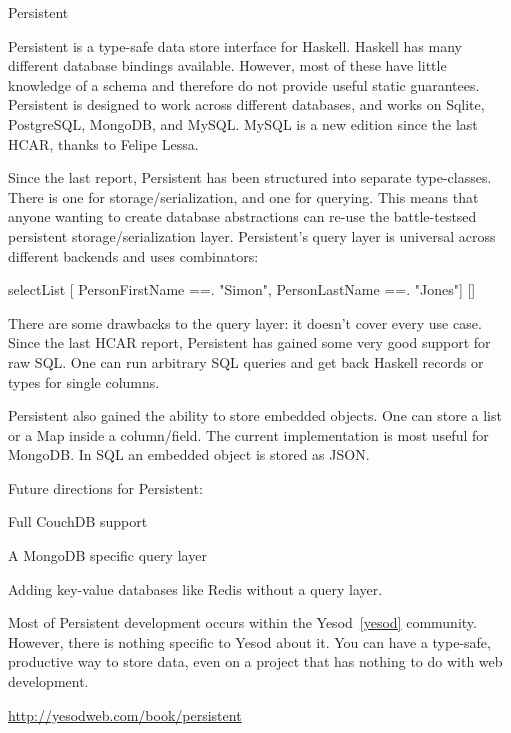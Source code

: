 \begin{hcarentry}{Persistent} 
\label{persistent}
\makeheader

Persistent is a type-safe data store interface for Haskell.
Haskell has many different database bindings available. However, most
of these have little knowledge of a schema and therefore do not provide
useful static guarantees. Persistent is designed to work across different databases, and works on Sqlite, PostgreSQL, MongoDB, and MySQL. MySQL is a new edition since the last HCAR, thanks to Felipe Lessa.

Since the last report, Persistent has been structured into separate type-classes. There is one for storage/serialization, and one for querying. This means that anyone wanting to create database abstractions can re-use the battle-testsed persistent storage/serialization layer. Persistent's query layer is universal across different backends and uses combinators:

\begin{code}
selectList [  PersonFirstName ==. "Simon", 
              PersonLastName ==. "Jones"] []
\end{code}

There are some drawbacks to the query layer: it doesn't cover every use case. Since the last HCAR report, Persistent has gained some very good support for raw SQL. One can run arbitrary SQL queries and get back Haskell records or types for single columns.

Persistent also gained the ability to store embedded objects. One can store a list or a Map inside a column/field. The current implementation is most useful for MongoDB. In SQL an embedded object is stored as JSON.

\FuturePlans 
Future directions for Persistent:
\begin{compactitem}
\item Full CouchDB support
\item A MongoDB specific query layer
\item Adding key-value databases like Redis without a query layer.
\end{compactitem}

Most of Persistent development occurs within the Yesod~\cref{yesod} community.
However, there is nothing specific to Yesod about it.
You can have a type-safe, productive way to store data,
even on a project that has nothing to do with web development.

\FurtherReading 
\url{http://yesodweb.com/book/persistent} 
\end{hcarentry}
